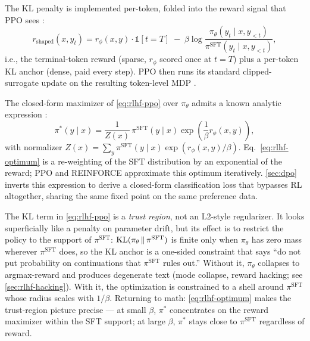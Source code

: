 The KL penalty is implemented per-token, folded into the reward
signal that PPO sees \citep[\S 3]{ouyang2022-instructgpt}:
\begin{equation}
r_{\mathrm{shaped}}(x, y_t)
  = r_\phi(x, y) \cdot \mathbb{1}[t = T]
    \;-\; \beta \log \frac{\pi_\theta(y_t \mid x, y_{<t})}{\pi^{\mathrm{SFT}}(y_t \mid x, y_{<t})},
\label{eq:rlhf-shape}
\end{equation}
i.e., the terminal-token reward (sparse, $r_\phi$ scored once at
$t = T$) plus a per-token KL anchor (dense, paid every step). PPO
then runs its standard clipped-surrogate update on the resulting
token-level MDP \citep{schulman2017-ppo}.

The closed-form maximizer of \cref{eq:rlhf-ppo} over $\pi_\theta$
admits a known analytic expression \citep[\S 4]{rafailov2023-dpo}:
\begin{equation}
\pi^*(y \mid x)
  = \frac{1}{Z(x)} \, \pi^{\mathrm{SFT}}(y \mid x)
    \exp\!\left(\frac{1}{\beta} r_\phi(x, y)\right),
\label{eq:rlhf-optimum}
\end{equation}
with normalizer $Z(x) = \sum_y \pi^{\mathrm{SFT}}(y \mid x)
\exp(r_\phi(x, y) / \beta)$. Eq.~\cref{eq:rlhf-optimum} is a
re-weighting of the SFT distribution by an exponential of the reward;
PPO and REINFORCE approximate this optimum iteratively. \cref{sec:dpo}
inverts this expression to derive a closed-form classification loss
that bypasses RL altogether, sharing the same fixed point on the
same preference data.

\begin{intuition}
The KL term in \cref{eq:rlhf-ppo} is a \emph{trust region}, not an
L2-style regularizer. It looks superficially like a penalty on
parameter drift, but its effect is to restrict the policy to the
support of $\pi^{\mathrm{SFT}}$: $\operatorname{KL}(\pi_\theta \,\|\, \pi^{\mathrm{SFT}})$
is finite only when $\pi_\theta$ has zero mass wherever
$\pi^{\mathrm{SFT}}$ does, so the KL anchor is a one-sided constraint
that says ``do not put probability on continuations that
$\pi^{\mathrm{SFT}}$ rules out.'' Without it, $\pi_\theta$ collapses
to argmax-reward and produces degenerate text (mode collapse, reward
hacking; see \cref{sec:rlhf-hacking}). With it, the optimization is
constrained to a shell around $\pi^{\mathrm{SFT}}$ whose radius scales
with $1/\beta$. Returning to math: \cref{eq:rlhf-optimum} makes the
trust-region picture precise — at small $\beta$, $\pi^*$ concentrates
on the reward maximizer within the SFT support; at large $\beta$,
$\pi^*$ stays close to $\pi^{\mathrm{SFT}}$ regardless of reward.
\end{intuition}

